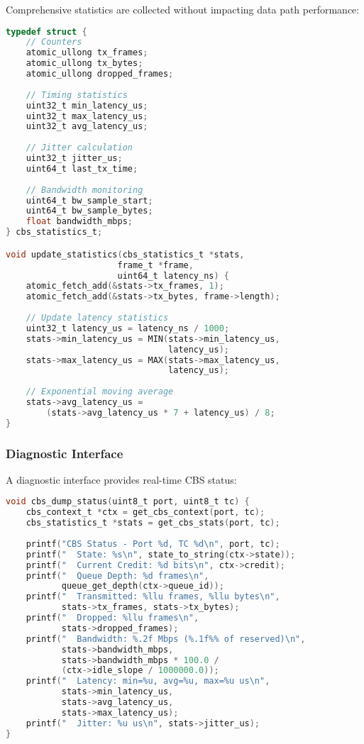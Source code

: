 \documentclass[10pt, journal, compsoc]{IEEEtran}
\begin{document}
Comprehensive statistics are collected without impacting data path performance:

\begin{lstlisting}[language=C, caption=Statistics Collection]
typedef struct {
    // Counters
    atomic_ullong tx_frames;
    atomic_ullong tx_bytes;
    atomic_ullong dropped_frames;
    
    // Timing statistics
    uint32_t min_latency_us;
    uint32_t max_latency_us;
    uint32_t avg_latency_us;
    
    // Jitter calculation
    uint32_t jitter_us;
    uint64_t last_tx_time;
    
    // Bandwidth monitoring
    uint64_t bw_sample_start;
    uint64_t bw_sample_bytes;
    float bandwidth_mbps;
} cbs_statistics_t;

void update_statistics(cbs_statistics_t *stats,
                      frame_t *frame,
                      uint64_t latency_ns) {
    atomic_fetch_add(&stats->tx_frames, 1);
    atomic_fetch_add(&stats->tx_bytes, frame->length);
    
    // Update latency statistics
    uint32_t latency_us = latency_ns / 1000;
    stats->min_latency_us = MIN(stats->min_latency_us,
                                latency_us);
    stats->max_latency_us = MAX(stats->max_latency_us,
                                latency_us);
    
    // Exponential moving average
    stats->avg_latency_us = 
        (stats->avg_latency_us * 7 + latency_us) / 8;
}
\end{lstlisting}

\subsubsection{Diagnostic Interface}

A diagnostic interface provides real-time CBS status:

\begin{lstlisting}[language=C, caption=Diagnostic Output]
void cbs_dump_status(uint8_t port, uint8_t tc) {
    cbs_context_t *ctx = get_cbs_context(port, tc);
    cbs_statistics_t *stats = get_cbs_stats(port, tc);
    
    printf("CBS Status - Port %d, TC %d\n", port, tc);
    printf("  State: %s\n", state_to_string(ctx->state));
    printf("  Current Credit: %d bits\n", ctx->credit);
    printf("  Queue Depth: %d frames\n", 
           queue_get_depth(ctx->queue_id));
    printf("  Transmitted: %llu frames, %llu bytes\n",
           stats->tx_frames, stats->tx_bytes);
    printf("  Dropped: %llu frames\n", 
           stats->dropped_frames);
    printf("  Bandwidth: %.2f Mbps (%.1f%% of reserved)\n",
           stats->bandwidth_mbps,
           stats->bandwidth_mbps * 100.0 / 
           (ctx->idle_slope / 1000000.0));
    printf("  Latency: min=%u, avg=%u, max=%u us\n",
           stats->min_latency_us,
           stats->avg_latency_us,
           stats->max_latency_us);
    printf("  Jitter: %u us\n", stats->jitter_us);
}
\end{lstlisting}
\end{document}
